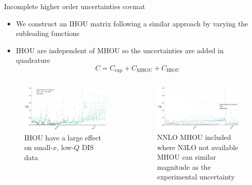 \begin{frame}{Incomplete higher order uncertainties covmat}
  \begin{itemize}
    \item We construct an IHOU matrix following a similar approach by varying the subleading functions
    \item IHOU are independent of MHOU so the uncertainties are added in quadrature
    $$C = C_\mathrm{exp}+C_\mathrm{MHOU}+C_\mathrm{IHOU}$$
  \end{itemize}

  \begin{columns}
    \begin{column}{0.49\textwidth}
      \begin{figure}[!t]
        \centering
        \includegraphics[width=.9\textwidth]{figures/diag_cov_dis_ihou.pdf}
        \caption*{IHOU have a large effect on small-$x$, low-$Q$ DIS data
        }
      \end{figure}
    \end{column}
    \begin{column}{0.49\textwidth}
      \begin{figure}[!t]
        \centering
        \includegraphics[width=.9\textwidth]{figures/diag_cov_dy_ihou_3pt_mhou.pdf}
        \caption*{NNLO MHOU included where N3LO not available \\
          MHOU can similar magnitude as the experimental uncertainty
        }
      \end{figure}
    \end{column}
  \end{columns}


\end{frame}


